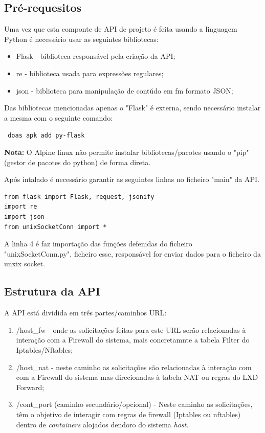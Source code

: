 \subsection{Pré-requesitos}

Uma vez que esta componte de API de projeto é feita usando a linguagem Python é necessário
usar as seguintes bibliotecas:

\begin{itemize}
    \item Flask - biblioteca responsável pela criação da API;
    \item re - biblioteca usada para expressões regulares;
    \item json - biblioteca para manipulação de contúdo em fm formato JSON;
\end{itemize}
    
Das bibliotecas mencionadas apenas o "Flask" é externa, sendo necessário instalar a mesma
com o seguinte comando:

\begin{tcolorbox}[colback=blue!5!white,colframe=blue!75!black]
    \verb | doas apk add py-flask |
\end{tcolorbox}

\textbf{Nota:} O Alpine linux não permite instalar bibliotecas/pacotes usando o "pip" (gestor de pacotes
do python) de forma direta.

Após intalado é necessário garantir as seguintes linhas no ficheiro "main" da API.

\begin{lstlisting}[language=csh, caption={Importações necessárias}]
from flask import Flask, request, jsonify
import re
import json
from unixSocketConn import *
\end{lstlisting}

A linha 4 é faz importação das funções defenidas do ficheiro "unixSocketConn.py", ficheiro esse, 
responsável for enviar dados para o ficheiro da unxix socket.




\subsection{Estrutura da API}

A API está dividida em três partes/caminhos URL:

\begin{enumerate}
    \item  \slash host\_fw - onde as solicitações feitas para este URL serão relacionadas à interação
    com a Firewall do sistema, mais concretamnte a tabela Filter do Iptables\slash Nftables;
    \item  \slash host\_nat - neste caminho as solicitações são relacionadas à interação com
    com a Firewall do sistema mas direcionadas à tabela NAT ou regras do LXD Forward;
    \item  \slash cont\_port (caminho secundário/opcional) - Neste caminho as solicitações, têm o objetivo de interagir com regras de firewall
    (Iptables ou nftables) dentro de \textit{containers} alojados dendoro do sistema \textit{host}. 
\end{enumerate}



